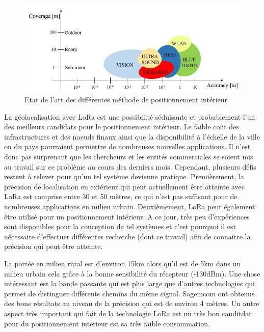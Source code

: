 \begin{figure}[htp]
	\begin{center}
		\includegraphics[scale=0.7]{figures/MethodePos.png}
		\caption{Etat de l'art des différentes méthode de positionnement intérieur \cite{INPOS}}
		\label{fig:MethodePos} %
	\end{center}
\end{figure}

La géolocalisation avec LoRa est une possibilité séduisante et probablement l'un des meilleurs candidats pour le positionnement intérieur. Le faible coût des infrastructures et des noeuds finaux ainsi que la disponibilité à l'échelle de la ville ou du pays pourraient permettre de nombreuses nouvelles applications. Il n’est donc pas surprenant que les chercheurs et les entités commerciales se soient mis au travail sur ce problème au cours des derniers mois. Cependant, plusieurs défis restent à relever pour qu'un tel système devienne pratique.
Premièrement, la précision de localisation en extérieur qui peut actuellement être atteinte avec LoRa est comprise entre 30 et 50 mètres, ce qui n’est pas suffisant pour de nombreuses applications en milieu urbain. Deuxièmement, LoRa peut également être utilisé pour un positionnement intérieur. A ce jour, très peu d’expériences sont disponibles pour la conception de tel systèmes et c'est pourquoi il est nécessaire d'effectuer différentes recherche (dont ce travail) afin de connaitre la précision qui peut être atteinte.

La portée en milieu rural est d'environ 15km alors qu'il est de 5km dans un milieu urbain cela grâce à la bonne sensibilité du récepteur (-130dBm). Une chose intéressant est la bande passante qui est plus large que d'autres technologies qui permet de distinguer différents chemins du même signal. Sagemcom ont obtenus des bons résultats au niveau de la précision qui est de environ 4 mètres.\cite{ML_indoor} Un autre aspect très important qui fait de la technologie LoRa est un très bon canditdat pour du positionnement intérieur est sa très faible consommation. 

